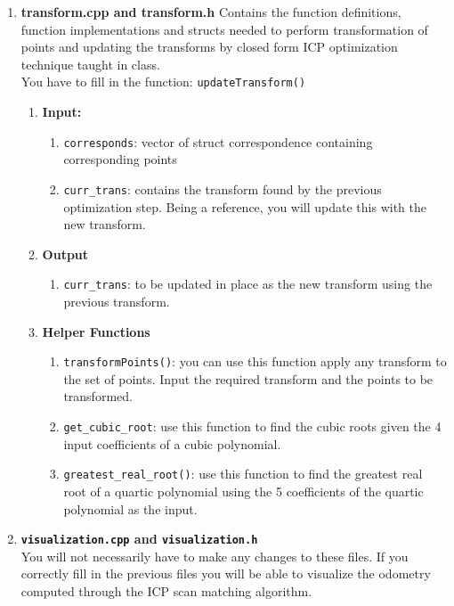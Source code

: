 \documentclass[letta4 paper]{article}
\numberwithin{equation}{section}
\newcommand{\0}{\mathbf{0}}
\begin{document}
\begin{enumerate}
	 		\item \textbf{transform.cpp and transform.h}
	 		Contains the function definitions, function implementations and structs needed to perform transformation of points and updating the transforms by closed form ICP optimization technique taught in class. \\
	 		You have to fill in the function: \texttt{updateTransform()}
	 		\begin{enumerate}
		 		\item \textbf{Input: }
		 		\begin{enumerate}
		 			\item \texttt{corresponds}: vector of struct correspondence containing corresponding points
		 			\item \texttt{curr\_trans}: contains the transform found by the previous optimization step. Being a reference, you will update this with the new transform. 
		 		\end{enumerate}
		 		
		 		\item \textbf{Output}
		 		\begin{enumerate}
		 			\item \texttt{curr\_trans}: to be updated in place as the new transform using the previous transform. 
		 		\end{enumerate}
		 		
		 		\item \textbf{Helper Functions}
		 		\begin{enumerate}
		 			\item \texttt{transformPoints()}: you can use this function apply any transform to the set of points. Input the required transform and the points to be transformed. 
		 			\item \texttt{get\_cubic\_root}: use this function to find the cubic roots given the 4 input coefficients of a cubic polynomial. 
		 			\item \texttt{greatest\_real\_root()}: use this function to find the greatest real root of a quartic polynomial using the 5 coefficients of the quartic polynomial as the input. 
		 		\end{enumerate}
		 	\end{enumerate}
	 	
	 		\item \textbf{\texttt{visualization.cpp} and \texttt{visualization.h}} \\
	 		You will not necessarily have to make any changes to these files. If you correctly fill in the previous files you will be able to visualize the odometry computed through the ICP scan matching algorithm.


\end{enumerate}
\end{document}
